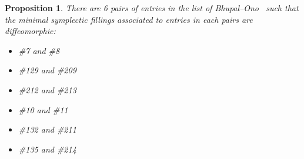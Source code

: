 \documentclass[reqno, twoside, a4paper]{amsart}
\newtheorem{proposition}[theorem]{Proposition}
\theoremstyle{definition}
\numberwithin{equation}{section}
\begin{document}
\begin{proposition}
There are 6 pairs of entries in the list of Bhupal--Ono~\cite[\S5]{Bhupal-Ono-2012} such that the minimal symplectic fillings associated to entries in each pairs are diffeomorphic:

\begin{multicols}{2}

\begin{itemize}
\item \#7 and \#8
\item \#129 and \#209
\item \#212 and \#213
\end{itemize}

\columnbreak

\begin{itemize}
\item \#10 and \#11
\item \#132 and \#211
\item \#135 and \#214
\end{itemize}
\end{multicols}
\end{proposition}
\end{document}
